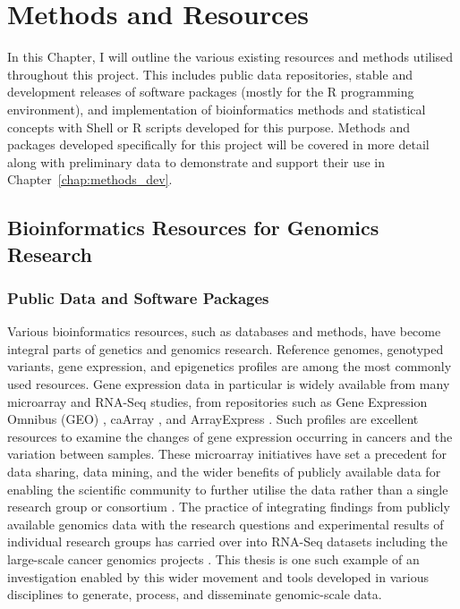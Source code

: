 \chapter{Methods and Resources}
\label{chap:methods}

In this Chapter, I will outline the various existing resources and methods utilised throughout this project. This includes public data repositories, stable and development releases of software packages (mostly for the R programming environment), and implementation of bioinformatics methods and statistical concepts with Shell or R scripts developed for this purpose. Methods and packages developed specifically for this project will be covered in more detail along with preliminary data to demonstrate and support their use in Chapter~\ref{chap:methods_dev}. 

\section{Bioinformatics Resources for Genomics Research}
\subsection{Public Data and Software Packages}
Various bioinformatics resources, such as databases and methods, have become integral parts of genetics and genomics research. Reference genomes, genotyped variants, gene expression, and epigenetics profiles are among the most commonly used resources. Gene expression data in particular is widely available from many microarray and RNA-Seq studies, from repositories such as Gene Expression Omnibus (GEO) \citep{GEO2016}, caArray \citep{caArray2014}, and ArrayExpress \citep{ArrayExpress2013}. Such profiles are excellent resources to examine the changes of gene expression occurring in cancers and the variation between samples. These microarray initiatives have set a precedent for data sharing, data mining, and the wider benefits of publicly available data for enabling the scientific community to further utilise the data rather than a single research group or consortium \citep{Rung2013}. The practice of integrating findings from publicly available genomics data with the research questions and experimental results of individual research groups has carried over into RNA-Seq datasets including the large-scale cancer genomics projects \citep{ICGC2011}. This thesis is one such example of an investigation enabled by this wider movement and tools developed in various disciplines to generate, process, and disseminate genomic-scale data.
 
